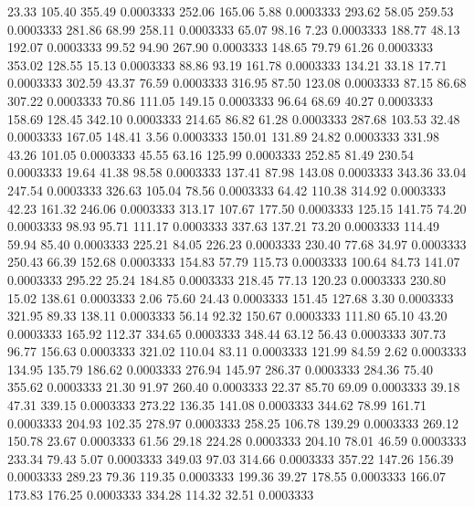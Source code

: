   23.33  105.40  355.49   0.0003333
 252.06  165.06    5.88   0.0003333
 293.62   58.05  259.53   0.0003333
 281.86   68.99  258.11   0.0003333
  65.07   98.16    7.23   0.0003333
 188.77   48.13  192.07   0.0003333
  99.52   94.90  267.90   0.0003333
 148.65   79.79   61.26   0.0003333
 353.02  128.55   15.13   0.0003333
  88.86   93.19  161.78   0.0003333
 134.21   33.18   17.71   0.0003333
 302.59   43.37   76.59   0.0003333
 316.95   87.50  123.08   0.0003333
  87.15   86.68  307.22   0.0003333
  70.86  111.05  149.15   0.0003333
  96.64   68.69   40.27   0.0003333
 158.69  128.45  342.10   0.0003333
 214.65   86.82   61.28   0.0003333
 287.68  103.53   32.48   0.0003333
 167.05  148.41    3.56   0.0003333
 150.01  131.89   24.82   0.0003333
 331.98   43.26  101.05   0.0003333
  45.55   63.16  125.99   0.0003333
 252.85   81.49  230.54   0.0003333
  19.64   41.38   98.58   0.0003333
 137.41   87.98  143.08   0.0003333
 343.36   33.04  247.54   0.0003333
 326.63  105.04   78.56   0.0003333
  64.42  110.38  314.92   0.0003333
  42.23  161.32  246.06   0.0003333
 313.17  107.67  177.50   0.0003333
 125.15  141.75   74.20   0.0003333
  98.93   95.71  111.17   0.0003333
 337.63  137.21   73.20   0.0003333
 114.49   59.94   85.40   0.0003333
 225.21   84.05  226.23   0.0003333
 230.40   77.68   34.97   0.0003333
 250.43   66.39  152.68   0.0003333
 154.83   57.79  115.73   0.0003333
 100.64   84.73  141.07   0.0003333
 295.22   25.24  184.85   0.0003333
 218.45   77.13  120.23   0.0003333
 230.80   15.02  138.61   0.0003333
   2.06   75.60   24.43   0.0003333
 151.45  127.68    3.30   0.0003333
 321.95   89.33  138.11   0.0003333
  56.14   92.32  150.67   0.0003333
 111.80   65.10   43.20   0.0003333
 165.92  112.37  334.65   0.0003333
 348.44   63.12   56.43   0.0003333
 307.73   96.77  156.63   0.0003333
 321.02  110.04   83.11   0.0003333
 121.99   84.59    2.62   0.0003333
 134.95  135.79  186.62   0.0003333
 276.94  145.97  286.37   0.0003333
 284.36   75.40  355.62   0.0003333
  21.30   91.97  260.40   0.0003333
  22.37   85.70   69.09   0.0003333
  39.18   47.31  339.15   0.0003333
 273.22  136.35  141.08   0.0003333
 344.62   78.99  161.71   0.0003333
 204.93  102.35  278.97   0.0003333
 258.25  106.78  139.29   0.0003333
 269.12  150.78   23.67   0.0003333
  61.56   29.18  224.28   0.0003333
 204.10   78.01   46.59   0.0003333
 233.34   79.43    5.07   0.0003333
 349.03   97.03  314.66   0.0003333
 357.22  147.26  156.39   0.0003333
 289.23   79.36  119.35   0.0003333
 199.36   39.27  178.55   0.0003333
 166.07  173.83  176.25   0.0003333
 334.28  114.32   32.51   0.0003333
